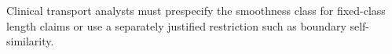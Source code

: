 Clinical transport analysts must prespecify the smoothness class for fixed-class length claims or use a separately justified restriction such as boundary self-similarity.